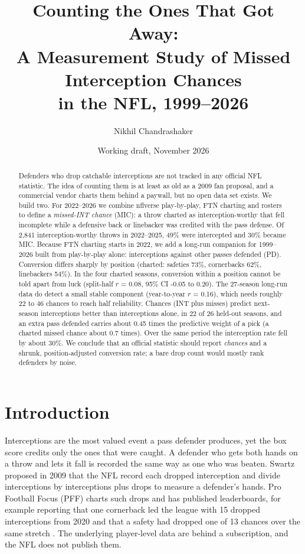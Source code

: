 \documentclass[11pt]{article}
\title{\textbf{Counting the Ones That Got Away:\\ A Measurement Study of Missed Interception Chances\\ in the NFL, 1999--2026}}
\author{Nikhil Chandrashaker}
\date{Working draft, November 2026}
\begin{document}
\maketitle

\begin{abstract}\noindent
Defenders who drop catchable interceptions are not tracked in any official NFL statistic. The idea of counting them is at least as old as a 2009 fan proposal, and a commercial vendor charts them behind a paywall, but no open data set exists. We build two. For 2022--2026 we combine nflverse play-by-play, FTN charting and rosters to define a \emph{missed-INT chance} (MIC): a throw charted as interception-worthy that fell incomplete while a defensive back or linebacker was credited with the pass defense. Of 2,841 interception-worthy throws in 2022--2025, 49\% were intercepted and 30\% became MIC. Because FTN charting starts in 2022, we add a long-run companion for 1999--2026 built from play-by-play alone: interceptions against other passes defended (PD). Conversion differs sharply by position (charted: safeties 73\%, cornerbacks 62\%, linebackers 54\%). In the four charted seasons, conversion within a position cannot be told apart from luck (split-half $r$ = 0.08, 95\% CI -0.05 to 0.20). The 27-season long-run data do detect a small stable component (year-to-year $r$ = 0.16), which needs roughly 22 to 46 chances to reach half reliability. Chances (INT plus misses) predict next-season interceptions better than interceptions alone, in 22 of 26 held-out seasons, and an extra pass defended carries about 0.45 times the predictive weight of a pick (a charted missed chance about 0.7 times). Over the same period the interception rate fell by about 30\%. We conclude that an official statistic should report \emph{chances} and a shrunk, position-adjusted conversion rate; a bare drop count would mostly rank defenders by noise.
\end{abstract}

\section{Introduction}
Interceptions are the most valued event a pass defender produces, yet the box score credits only the ones that were caught. A defender who gets both hands on a throw and lets it fall is recorded the same way as one who was beaten. Swartz \cite{swartz2009} proposed in 2009 that the NFL record each dropped interception and divide interceptions by interceptions plus drops to measure a defender's hands. Pro Football Focus (PFF) charts such drops and has published leaderboards, for example reporting that one cornerback led the league with 15 dropped interceptions from 2020 and that a safety had dropped one of 13 chances over the same stretch \cite{pff2024}. The underlying player-level data are behind a subscription, and the NFL does not publish them.
\end{document}
